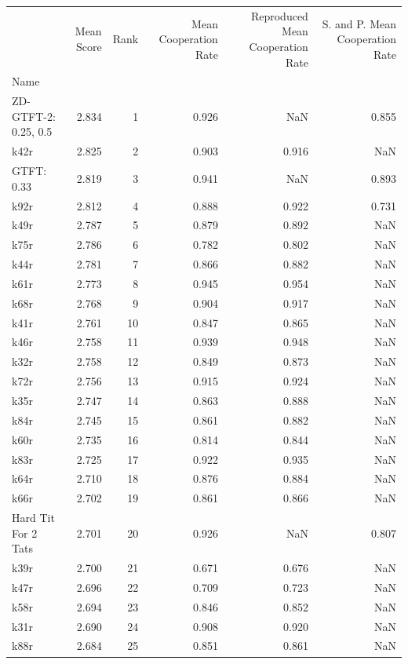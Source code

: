 \begin{tabular}{lrrrrr}
\toprule
 & Mean Score & Rank & Mean Cooperation Rate & Reproduced Mean Cooperation Rate & S. and P. Mean Cooperation Rate \\
Name &  &  &  &  &  \\
\midrule
ZD-GTFT-2: 0.25, 0.5 & 2.834 & 1 & 0.926 & NaN & 0.855 \\
k42r & 2.825 & 2 & 0.903 & 0.916 & NaN \\
GTFT: 0.33 & 2.819 & 3 & 0.941 & NaN & 0.893 \\
k92r & 2.812 & 4 & 0.888 & 0.922 & 0.731 \\
k49r & 2.787 & 5 & 0.879 & 0.892 & NaN \\
k75r & 2.786 & 6 & 0.782 & 0.802 & NaN \\
k44r & 2.781 & 7 & 0.866 & 0.882 & NaN \\
k61r & 2.773 & 8 & 0.945 & 0.954 & NaN \\
k68r & 2.768 & 9 & 0.904 & 0.917 & NaN \\
k41r & 2.761 & 10 & 0.847 & 0.865 & NaN \\
k46r & 2.758 & 11 & 0.939 & 0.948 & NaN \\
k32r & 2.758 & 12 & 0.849 & 0.873 & NaN \\
k72r & 2.756 & 13 & 0.915 & 0.924 & NaN \\
k35r & 2.747 & 14 & 0.863 & 0.888 & NaN \\
k84r & 2.745 & 15 & 0.861 & 0.882 & NaN \\
k60r & 2.735 & 16 & 0.814 & 0.844 & NaN \\
k83r & 2.725 & 17 & 0.922 & 0.935 & NaN \\
k64r & 2.710 & 18 & 0.876 & 0.884 & NaN \\
k66r & 2.702 & 19 & 0.861 & 0.866 & NaN \\
Hard Tit For 2 Tats & 2.701 & 20 & 0.926 & NaN & 0.807 \\
k39r & 2.700 & 21 & 0.671 & 0.676 & NaN \\
k47r & 2.696 & 22 & 0.709 & 0.723 & NaN \\
k58r & 2.694 & 23 & 0.846 & 0.852 & NaN \\
k31r & 2.690 & 24 & 0.908 & 0.920 & NaN \\
k88r & 2.684 & 25 & 0.851 & 0.861 & NaN \\
\bottomrule
\end{tabular}
